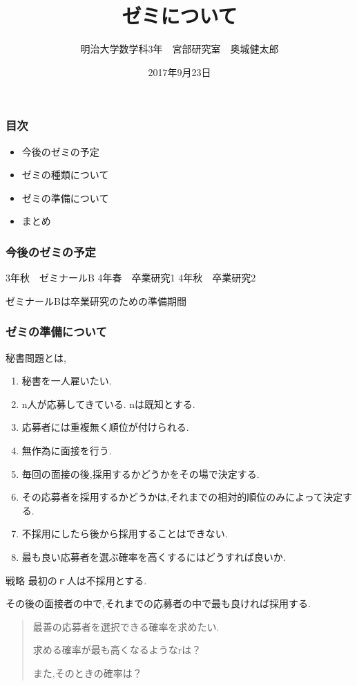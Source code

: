 \documentclass[dvipdfmx,11pt]{beamer}
\title{ゼミについて}
\author{明治大学数学科3年　宮部研究室　奥城健太郎}
\institute{宮部研究室3年生歓迎会}
\date{2017年9月23日}
\begin{document}
\begin{frame}
\frametitle{}
\titlepage
\end{frame}

\begin{frame}
\frametitle{目次}
\begin{itemize}
 \item 今後のゼミの予定
 \item ゼミの種類について
 \item ゼミの準備について
 \item まとめ
\end{itemize}
\end{frame}

\begin{frame}
\frametitle{今後のゼミの予定}
3年秋　ゼミナールB
4年春　卒業研究1
4年秋　卒業研究2
\end{frame}

\begin{frame}
ゼミナールBは卒業研究のための準備期間
\end{frame}

\begin{frame}
\frametitle{ゼミの準備について}
秘書問題とは,
\begin{enumerate}
 \item<2-> 秘書を一人雇いたい.
 \item<3-> n人が応募してきている. nは既知とする.
 \item<4-> 応募者には重複無く順位が付けられる.
 \item<5-> 無作為に面接を行う.
 \item<6-> 毎回の面接の後,採用するかどうかをその場で決定する.
 \item<7-> その応募者を採用するかどうかは,それまでの相対的順位のみによって決定する.
 \item<8-> 不採用にしたら後から採用することはできない.
 \item<9-> 最も良い応募者を選ぶ確率を高くするにはどうすれば良いか.
\end{enumerate}
\end{frame}

\begin{frame}
\begin{block}{戦略}
最初のｒ人は不採用とする.

その後の面接者の中で,それまでの応募者の中で最も良ければ採用する.
\end{block}

\begin{quote}
最善の応募者を選択できる確率を求めたい.

求める確率が最も高くなるようなrは？

また,そのときの確率は？
\end{quote}
\end{frame}
\end{document}
